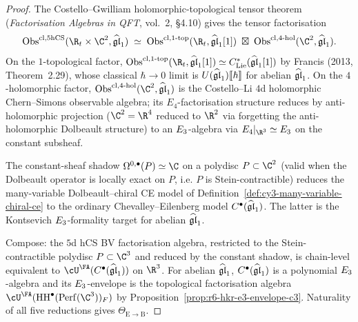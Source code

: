 \begin{proof}
The Costello--Gwilliam holomorphic-topological tensor theorem
(\emph{Factorisation Algebras in QFT}, vol.~2, \S 4.10) gives the
tensor factorisation
\[
\Obs^{\mathrm{cl},5\hCS}(\R_t\times\C^2,\ghat)
\;\simeq\;
\Obs^{\mathrm{cl},1\text{-top}}(\R_t,\ghat[1])
\;\boxtimes\;
\Obs^{\mathrm{cl},4\text{-hol}}(\C^2,\ghat).
\]
On the $1$-topological factor, $\Obs^{\mathrm{cl},1\text{-top}}(\R_t,\ghat[1])
\simeq C^*_{\mathrm{Lie}}(\ghat[1])$ by Francis (2013, Theorem~2.29),
whose classical $\hbar\to 0$ limit is $U(\widehat{\mathfrak{gl}}_1)\llbracket\hbar\rrbracket$
for abelian $\widehat{\mathfrak{gl}}_1$. On the $4$-holomorphic factor,
$\Obs^{\mathrm{cl},4\text{-hol}}(\C^2,\ghat)$ is the Costello--Li $4$d
holomorphic Chern--Simons observable algebra; its $E_4$-factorisation
structure reduces by anti-holomorphic projection ($\C^2 = \R^4$ reduced
to $\R^2$ via forgetting the anti-holomorphic Dolbeault structure) to
an $E_3$-algebra via $E_4|_{\R^3} \simeq \Ethree$ on the constant
subsheaf.

The constant-sheaf shadow
$\Omega^{0,\bullet}(P)\simeq\C$ on a polydisc $P\subset\C^2$ (valid
when the Dolbeault operator is locally exact on $P$, i.e. $P$ is
Stein-contractible) reduces the many-variable Dolbeault--chiral CE
model of Definition~\ref{def:cy3-many-variable-chiral-ce} to the
ordinary Chevalley--Eilenberg model $C^\bullet(\widehat{\mathfrak{gl}}_1)$. The latter is
the Kontsevich $E_3$-formality target for abelian $\widehat{\mathfrak{gl}}_1$.

Compose: the $5$d hCS BV factorisation algebra, restricted to the
Stein-contractible polydisc $P\subset\C^3$ and reduced by the constant
shadow, is chain-level equivalent to $\cU^\FA(C^\bullet(\ghat))$ on
$\R^3$. For abelian $\widehat{\mathfrak{gl}}_1$, $C^\bullet(\widehat{\mathfrak{gl}}_1)$ is a polynomial
$E_3$-algebra and its $E_3$-envelope is the topological
factorisation algebra $\cU^\FA(\HH^\bullet(\Perf(\C^3))_F)$ by
Proposition~\ref{prop:r6-hkr-e3-envelope-c3}. Naturality of all five
reductions gives $\Theta_{\mathrm E\to\mathrm B}$.
\end{proof}

